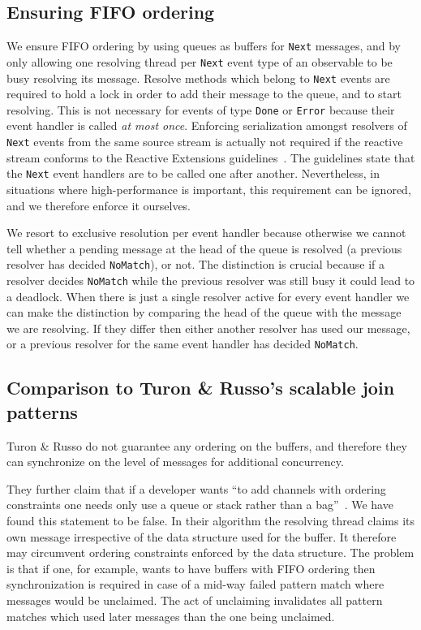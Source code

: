 \documentclass[runningheads]{llncs}
\begin{document}
\begin{sloppypar}
\subsection{Ensuring FIFO ordering}

We ensure FIFO ordering by using queues as buffers for \texttt{Next} messages,
and by only allowing one resolving thread per \texttt{Next} event type of an
observable to be busy resolving its message. Resolve methods which belong to
\texttt{Next} events are required to hold a lock in order to add their message
to the queue, and to start resolving. This is not necessary for events of type
\texttt{Done} or \texttt{Error} because their event handler is called {\em at
most once}. Enforcing serialization amongst resolvers of \texttt{Next} events
from the same source stream is actually not required if the reactive stream
conforms to the Reactive Extensions guidelines~\cite{RxContract:2010}. The
guidelines state that the \texttt{Next} event handlers are to be called one
after another. Nevertheless, in situations where high-performance is
important, this requirement can be ignored, and we therefore enforce it
ourselves.

We resort to exclusive resolution per event handler because otherwise we cannot
tell whether a pending message at the head of the queue is resolved (a
previous resolver has decided \texttt{NoMatch}), or not. The distinction is
crucial because if a resolver decides \texttt{NoMatch} while the previous
resolver was still busy it could lead to a deadlock. When there is just a
single resolver active for every event handler we can make the distinction by
comparing the head of the queue with the message we are resolving. If they
differ then either another resolver has used our message, or a previous
resolver for the same event handler has decided \texttt{NoMatch}.


\subsection{Comparison to Turon \& Russo's scalable join patterns}\label{sec:comp-turon-russo}

Turon \& Russo do not guarantee any ordering on the buffers, and therefore
they can synchronize on the level of messages for additional concurrency.

They further claim that if a developer wants ``to add channels with ordering
constraints one needs only use a queue or stack rather than a
bag''~\cite{Turon:2011}. We have found this statement to be false. In their
algorithm the resolving thread claims its own message irrespective of the
data structure used for the buffer. It therefore may circumvent ordering
constraints enforced by the data structure. The problem is that if one, for
example, wants to have buffers with FIFO ordering then synchronization is
required in case of a mid-way failed pattern match where messages would be
unclaimed. The act of unclaiming invalidates all pattern matches which used
later messages than the one being unclaimed.


\end{sloppypar}
\end{document}
